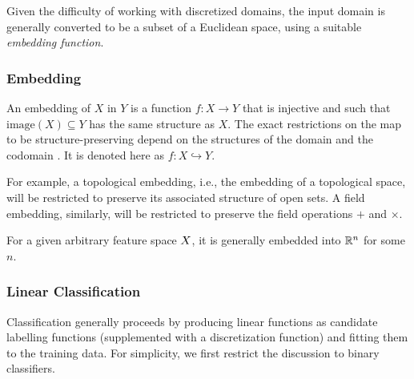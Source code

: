 Given the difficulty of working with discretized domains, the input domain is
generally converted to be a subset of a Euclidean space, using a suitable
\emph{embedding function}.

\subsubsection{Embedding}
An embedding of \(X\) in \(Y\) is a function \(f:X \to Y\) that is injective and
such that \(\text{image}(X) \subseteq Y\) has the same structure as \(X\). The
exact restrictions on the map to be structure-preserving depend on the
structures of the domain and the codomain \cite{sankappanavar1981course}. It is
denoted here as \(f:X\hookrightarrow Y\).

For example, a topological embedding, i.e., the embedding of a topological
space, will be restricted to preserve its associated structure of open sets. A
field embedding, similarly, will be restricted to preserve the field operations
\(+\) and \(\times\).

For a given arbitrary feature space \(X\), it is generally embedded
into \(\mathbb{R}^n\) for some \(n\).

\subsubsection{Linear Classification}
Classification generally proceeds by producing linear functions as candidate
labelling functions (supplemented with a discretization function) and fitting
them to the training data. For simplicity, we first restrict the discussion to
binary classifiers.

